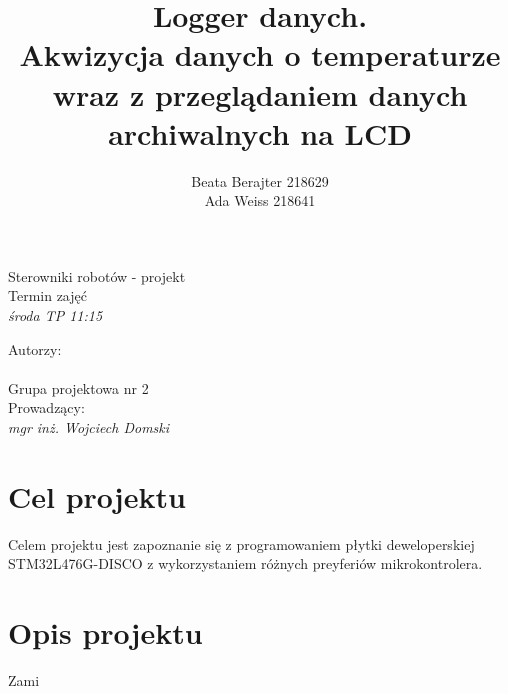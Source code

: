 \documentclass[a4paper,12pt]{article}
\author{Beata Berajter 218629\\
Ada Weiss 218641 }%
\title{Logger danych.\\Akwizycja danych o temperaturze wraz z przeglądaniem danych archiwalnych na LCD }
\makeatletter
\renewcommand{\maketitle}{\begin{titlepage}  
    \vspace*{1cm}
    \begin{center}
  Sterowniki robotów - projekt\\
Termin zajęć\\
\textit{środa TP 11:15}
    \end{center}
      \vspace{3cm}
    \begin{center}
     \LARGE \textsc {\@title}
         \end{center}
     \vspace{1cm}
    
    \begin{center}
    Autorzy:\\
   \textit{\@author} \\
\vspace{1cm}
Grupa projektowa nr 2\\
\vspace{2cm}
Prowadzący:\\
 \textit{mgr inż. Wojciech Domski}

     \end{center}
      \vspace{1cm}
    
    
    \vspace*{\stretch{6}}
    \begin{center}
    \@date
    \end{center}
  \end{titlepage}
}
\makeatother
\begin{document}
\newpage
\maketitle
\newpage
\tableofcontents

\newpage
\section{Cel projektu}
Celem projektu jest zapoznanie się z programowaniem płytki deweloperskiej STM32L476G-DISCO z wykorzystaniem różnych preyferiów mikrokontrolera.
\section{Opis projektu}
Zami
\end{document}
